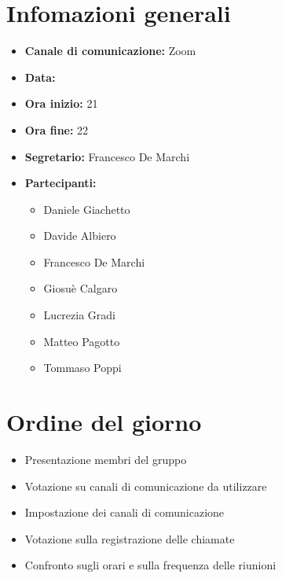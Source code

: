 \section{Infomazioni generali}

\begin{itemize}

	\item \textbf{Canale di comunicazione:} Zoom
	
	\item \textbf{Data:} \DataMeeting{}
	
	\item \textbf{Ora inizio:} 21
	
	\item \textbf{Ora fine:} 22
	
	\item \textbf{Segretario:} Francesco De Marchi
	
	\item \textbf{Partecipanti:}
	
		\begin{itemize}
		
			\item Daniele Giachetto
			\item Davide Albiero
			\item Francesco De Marchi
			\item Giosuè Calgaro
			\item Lucrezia Gradi
			\item Matteo Pagotto
			\item Tommaso Poppi
				 
		\end{itemize}

\end{itemize}

\section{Ordine del giorno}

\begin{itemize}

	\item Presentazione membri del gruppo

	\item Votazione su canali di comunicazione da utilizzare

	\item Impostazione dei canali di comunicazione

	\item Votazione sulla registrazione delle chiamate

	\item Confronto sugli orari e sulla frequenza delle riunioni


\end{itemize}

